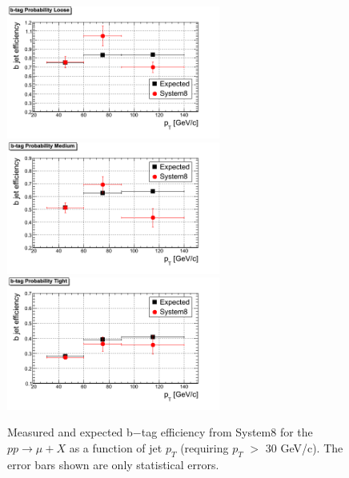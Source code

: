 \begin{figure}[htbp]
  \begin{center}
    \includegraphics[width=70mm]{Figures/JPL_Tag.png}
    \includegraphics[width=70mm]{Figures/JPM_Tag.png}
    \includegraphics[width=70mm]{Figures/JPT_Tag.png}
  \end{center}
  \caption{Measured and expected b$-$tag efficiency from System8 for the
$pp\rightarrow \mu +X $ as a function of jet $p_T $ 
(requiring $p_T $ $> $ 30 GeV/c). The error bars shown are only statistical 
errors.}
  \label{fig:S8_JP_results}
\end{figure}

\clearpage

